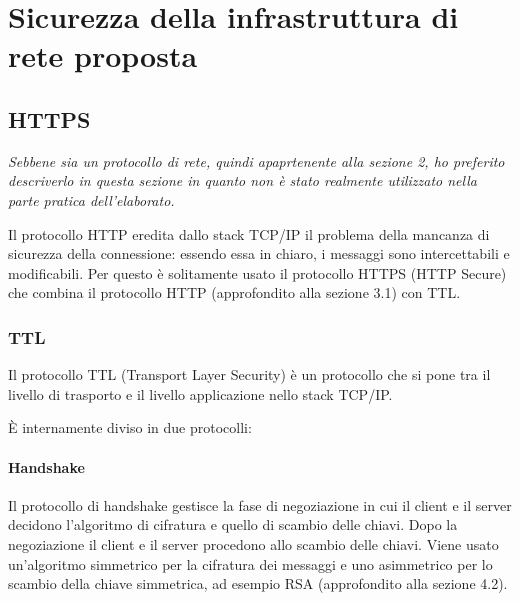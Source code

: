 \section{Sicurezza della infrastruttura di rete proposta}

\subsection{HTTPS}

\textit{Sebbene sia un protocollo di rete, quindi apaprtenente alla sezione 2, ho preferito descriverlo in questa sezione in quanto non è stato realmente utilizzato nella parte pratica dell'elaborato.}
\vspace{1em}

Il protocollo HTTP eredita dallo stack TCP/IP il problema della mancanza di sicurezza della connessione: essendo essa in chiaro, i messaggi sono intercettabili e modificabili. Per questo è solitamente usato il protocollo HTTPS (HTTP Secure) che combina il protocollo HTTP (approfondito alla sezione 3.1) con TTL.

\subsubsection{TTL}

Il protocollo TTL (Transport Layer Security) è un protocollo che si pone tra il livello di trasporto e il livello applicazione nello stack TCP/IP.

È internamente diviso in due protocolli:

\paragraph{Handshake}
Il protocollo di handshake gestisce la fase di negoziazione in cui il client e il server decidono l'algoritmo di cifratura e quello di scambio delle chiavi. Dopo la negoziazione il client e il server procedono allo scambio delle chiavi. Viene usato un'algoritmo simmetrico per la cifratura dei messaggi e uno asimmetrico per lo scambio della chiave simmetrica, ad esempio RSA (approfondito alla sezione 4.2).

